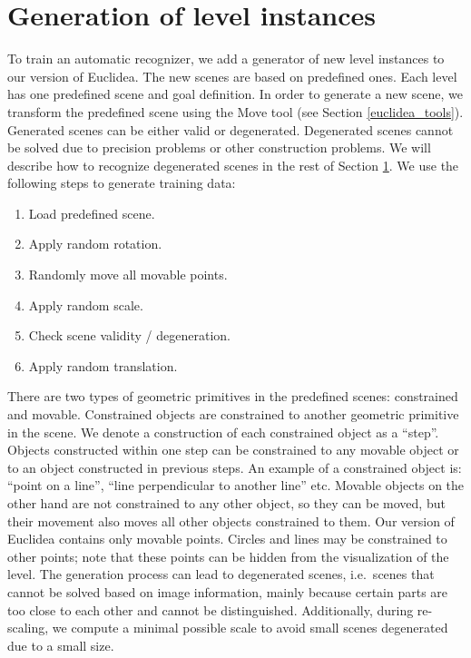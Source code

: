 \section{Generation of level instances} \label{data_generation}
\label{data_gen_ref}
To train an automatic recognizer, we add a generator of new level instances to our version of Euclidea. The new scenes are based on predefined ones. Each level has one predefined scene and goal definition. In order to generate a new scene, we transform the predefined scene using the Move tool (see Section \ref{euclidea_tools}). Generated scenes can be either valid or degenerated. Degenerated scenes cannot be solved due to precision problems or other construction problems. We will describe how to recognize degenerated scenes in the rest of Section \ref{data_generation}.
\newline \newline
We use the following steps to generate training data:
\begin{enumerate}
  \item Load predefined scene.
  \item Apply random rotation.
  \item Randomly move all movable points.
  \item Apply random scale. 
  \item Check scene validity / degeneration.
  \item Apply random translation.
\end{enumerate}
There are two types of geometric primitives in the predefined scenes: constrained and movable. Constrained objects are constrained to another geometric primitive in the scene. We denote a construction of each constrained object as a ``step''. Objects constructed within one step can be constrained to any movable object or to an object constructed in previous steps.
An example of a constrained object is: ``point on a line'', ``line perpendicular to another line'' etc.
Movable objects on the other hand are not constrained to any other object, so they can be moved, but their movement also moves all other objects constrained to them. Our version of Euclidea contains only movable points. Circles and lines may be constrained to other points; note that these points can be hidden from the visualization of the level.
\newline \newline
The generation process can lead to degenerated scenes, i.e.~scenes that cannot be solved based on image information, mainly because certain parts are too close to each other and cannot be distinguished. Additionally, during re-scaling, we compute a minimal possible scale to avoid small scenes degenerated due to a small size.
 
